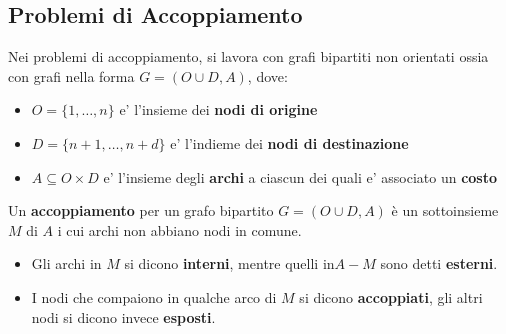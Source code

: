 \documentclass[a4paper,12pt]{article}
\begin{document}
\subsection{Problemi di Accoppiamento}
Nei problemi di accoppiamento, si lavora con grafi bipartiti non
orientati ossia con grafi nella forma $G = (O \cup D, A)$, dove:
\begin{itemize}
  \item $O = \{1, \dots, n\}$ e' l'insieme dei \textbf{nodi di origine}
  \item $D = \{n+1, \dots, n+d\}$ e' l'indieme dei \textbf{nodi di destinazione}
  \item $A \subseteq O \times D$ e' l'insieme degli \textbf{archi} a ciascun dei quali e' associato un \textbf{costo}
\end{itemize}
Un \textbf{accoppiamento} per un grafo bipartito $G = (O \cup D, A)$ è un
sottoinsieme $M$ di $A$ i cui archi non abbiano nodi in comune.
\begin{itemize}
  \item Gli archi in $M$ si dicono \textbf{interni}, mentre quelli in$ A-M$ sono detti \textbf{esterni}.
  \item I nodi che compaiono in qualche arco di $M$ si dicono \textbf{accoppiati}, gli altri nodi si dicono invece \textbf{esposti}.
\end{itemize}
\\
\vspace{1px}\\
\end{document}
